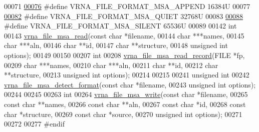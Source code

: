 \begin{DoxyCode}
00071 
\mbox{\hyperlink{group__file__utils_ga1577ea0f497d9c501549c863a4f2c089}{00076}} \textcolor{preprocessor}{#define VRNA\_FILE\_FORMAT\_MSA\_APPEND       16384U}
00077 
\mbox{\hyperlink{group__file__utils_ga73aa3701a22c5acfcb2e8927287a0554}{00082}} \textcolor{preprocessor}{#define VRNA\_FILE\_FORMAT\_MSA\_QUIET        32768U}
00083 
\mbox{\hyperlink{group__file__utils_gad98ca08968d19f221f29d2a1faf26887}{00088}} \textcolor{preprocessor}{#define VRNA\_FILE\_FORMAT\_MSA\_SILENT       65536U}
00089 
00142 \textcolor{keywordtype}{int}
00143 \mbox{\hyperlink{group__file__utils_ga08a01c40ac5f5e0e04e9ae2258c99aa6}{vrna\_file\_msa\_read}}(\textcolor{keyword}{const} \textcolor{keywordtype}{char}   *filename,
00144                    \textcolor{keywordtype}{char}         ***names,
00145                    \textcolor{keywordtype}{char}         ***aln,
00146                    \textcolor{keywordtype}{char}         **\textcolor{keywordtype}{id},
00147                    \textcolor{keywordtype}{char}         **structure,
00148                    \textcolor{keywordtype}{unsigned} \textcolor{keywordtype}{int} options);
00149 
00150 
00207 \textcolor{keywordtype}{int}
00208 \mbox{\hyperlink{group__file__utils_ga59204cd1daa4927f5127cc65a2886efd}{vrna\_file\_msa\_read\_record}}(FILE          *fp,
00209                           \textcolor{keywordtype}{char}          ***names,
00210                           \textcolor{keywordtype}{char}          ***aln,
00211                           \textcolor{keywordtype}{char}          **\textcolor{keywordtype}{id},
00212                           \textcolor{keywordtype}{char}          **structure,
00213                           \textcolor{keywordtype}{unsigned} \textcolor{keywordtype}{int}  options);
00214 
00215 
00241 \textcolor{keywordtype}{unsigned} \textcolor{keywordtype}{int}
00242 \mbox{\hyperlink{group__file__utils_ga627ac281b5f11c63861726e6472626c9}{vrna\_file\_msa\_detect\_format}}(\textcolor{keyword}{const} \textcolor{keywordtype}{char}    *filename,
00243                             \textcolor{keywordtype}{unsigned} \textcolor{keywordtype}{int}  options);
00244 
00245 
00263 \textcolor{keywordtype}{int}
00264 \mbox{\hyperlink{group__file__utils_ga0c90faf1515ce0b16620036b1055ff1e}{vrna\_file\_msa\_write}}(\textcolor{keyword}{const} \textcolor{keywordtype}{char}    *filename,
00265                     \textcolor{keyword}{const} \textcolor{keywordtype}{char}    **names,
00266                     \textcolor{keyword}{const} \textcolor{keywordtype}{char}    **aln,
00267                     \textcolor{keyword}{const} \textcolor{keywordtype}{char}    *\textcolor{keywordtype}{id},
00268                     \textcolor{keyword}{const} \textcolor{keywordtype}{char}    *structure,
00269                     \textcolor{keyword}{const} \textcolor{keywordtype}{char}    *source,
00270                     \textcolor{keywordtype}{unsigned} \textcolor{keywordtype}{int}  options);
00271 
00272 
00277 \textcolor{preprocessor}{#endif}
\end{DoxyCode}

